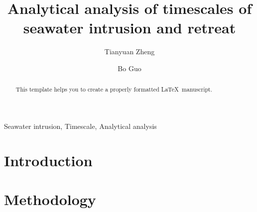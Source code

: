 \documentclass[review]{elsarticle}
\begin{document}
\begin{frontmatter}

\title{Analytical analysis of timescales of seawater intrusion and retreat}

\author[label1,label2]{Tianyuan Zheng}
\author[label3]{Bo Guo}
\address[label1]{Department of Environmental Informatics, Helmholtz Centre for Environmental Research - UFZ, Permoserstra{\ss}e 15, 04318 Leipzig, Germany}
\address[label2]{Applied Environmental Systems Analysis, Dresden University of Technology, Germany}
\address[label3]{Civil and Environmental Engineering, Princeton University, NJ, US, 08544}




\begin{abstract}
This template helps you to create a properly formatted \LaTeX\ manuscript.
\end{abstract}

\begin{keyword}
Seawater intrusion, Timescale, Analytical analysis
\end{keyword}

\end{frontmatter}

\linenumbers

\section{Introduction}

\section{Methodology}
\end{document}
